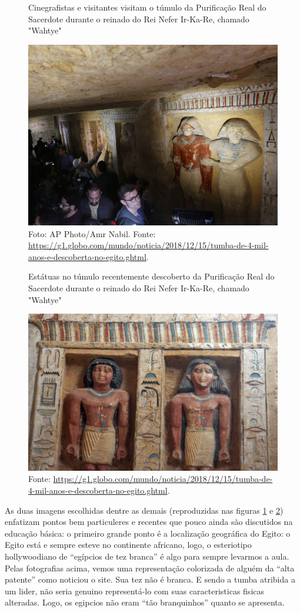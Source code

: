 \begin{refsection}
    \begin{figure}[ht]%
        \centering%
        \caption{Cinegrafistas e visitantes visitam o túmulo da Purificação Real do Sacerdote durante o reinado do Rei Nefer Ir-Ka-Re, chamado "Wahtye"}%
        \includegraphics[width=.75\textwidth]{articles/16-sair-da-piramide-con/purif-real.jpg}%
        \caption*{Foto: AP Photo/Amr Nabil. Fonte: \url{https://g1.globo.com/mundo/noticia/2018/12/15/tumba-de-4-mil-anos-e-descoberta-no-egito.ghtml}.}%
        \label{fig:purif-real}%
    \end{figure}%

    \begin{figure}[ht]%
        \centering%
        \caption{Estátuas no túmulo recentemente descoberto da Purificação Real do Sacerdote durante o reinado do Rei Nefer Ir-Ka-Re, chamado "Wahtye"}%
        \includegraphics[width=.75\textwidth]{articles/16-sair-da-piramide-con/estatuas.jpg}%
        \caption*{Fonte: \url{https://g1.globo.com/mundo/noticia/2018/12/15/tumba-de-4-mil-anos-e-descoberta-no-egito.ghtml}.}%
        \label{fig:estatua-egypt}%
    \end{figure}%

    As duas imagens escolhidas dentre as demais (reproduzidas nas figuras \ref{fig:purif-real} e \ref{fig:estatua-egypt}) enfatizam pontos bem particuleres e recentes que pouco ainda são discutidos na educação básica: o primeiro grande ponto é a localização geográfica do Egito: o Egito está e sempre esteve no continente africano, logo, o esteriotipo hollywoodiano de ``egípcios de tez branca'' é algo para sempre levarmos a aula. Pelas fotografias acima, vemos uma representação colorizada de alguém da ``alta patente'' como noticiou o site. Sua tez não é branca. E sendo a tumba atribida a um lider, não seria genuino representá-lo com suas caracteristicas fisicas alteradas. Logo, os egipcios não eram ``tão branquinhos'' quanto se apresenta.


\end{refsection}
